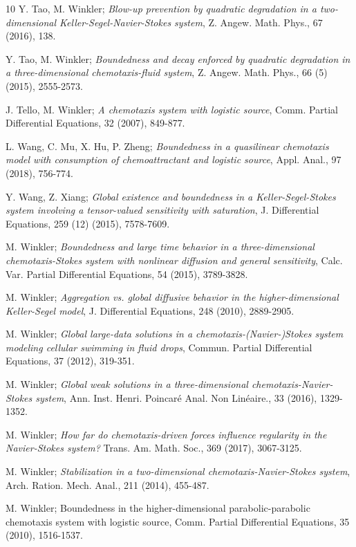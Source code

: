 \documentclass[reqno]{amsart}
\begin{document}
\begin{thebibliography}{10}
 Y. Tao, M. Winkler;
\emph{Blow-up prevention by quadratic degradation in a two-dimensional 
Keller-Segel-Navier-Stokes system}, Z. Angew. Math. Phys., 67 (2016), 138.

 Y. Tao, M. Winkler;
\emph{Boundedness and decay enforced by quadratic degradation in a three-dimensional 
chemotaxis-fluid system}, Z. Angew. Math. Phys., 66 (5) (2015), 2555-2573.

 J. Tello, M. Winkler;
\emph{A chemotaxis system with logistic source}, 
Comm. Partial Differential Equations, 32 (2007), 849-877.

 L. Wang, C. Mu, X. Hu, P. Zheng;
\emph{Boundedness in a quasilinear chemotaxis model with consumption of 
chemoattractant and logistic source}, Appl. Anal., 97 (2018), 756-774.

 Y. Wang, Z. Xiang;
\emph{Global existence and boundedness in a Keller-Segel-Stokes system involving 
a tensor-valued sensitivity with saturation}, 
J. Differential Equations, 259 (12) (2015), 7578-7609.

 M. Winkler;
\emph{Boundedness and large time behavior in a three-dimensional chemotaxis-Stokes 
system with nonlinear diffusion and general sensitivity}, 
Calc. Var. Partial Differential Equations, 54 (2015), 3789-3828.

 M. Winkler;
\emph{Aggregation vs. global diffusive behavior in the higher-dimensional Keller-Segel
 model}, J. Differential Equations, 248 (2010), 2889-2905.

 M. Winkler;
\emph{Global large-data solutions in a chemotaxis-(Navier-)Stokes system modeling 
cellular swimming in fluid drops}, 
Commun. Partial Differential Equations, 37 (2012), 319-351.

 M. Winkler;
\emph{Global weak solutions in a three-dimensional chemotaxis-Navier-Stokes system}, 
Ann. Inst. Henri. Poincar\'e Anal. Non Lin\'eaire., 33 (2016), 1329-1352.

 M. Winkler;
\emph{How far do chemotaxis-driven forces influence regularity in the Navier-Stokes 
system?} Trans. Am. Math. Soc., 369 (2017), 3067-3125.

 M. Winkler;
\emph{Stabilization in a two-dimensional chemotaxis-Navier-Stokes system}, 
Arch. Ration. Mech. Anal., 211 (2014), 455-487.

 M. Winkler; Boundedness in the higher-dimensional parabolic-parabolic chemotaxis system with logistic source, Comm. Partial Differential Equations, 35 (2010), 1516-1537.


\end{thebibliography}
\end{document}
